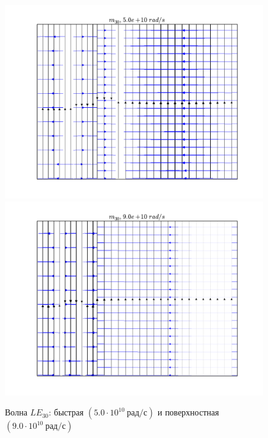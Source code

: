 \begin{figure}[h]
\center
\includegraphics[width=.47\textwidth]{field/field_le_3_0_5,0e+10.png}\hfill
\includegraphics[width=.47\textwidth]{field/field_le_3_0_9,0e+10.png}
\caption{Волна \(LE_{30}\): быстрая \((5.0\cdot10^{10}~\text{рад/с})\) и
поверхностная \((9.0\cdot10^{10}~\text{рад/с})\)}
\end{figure}

